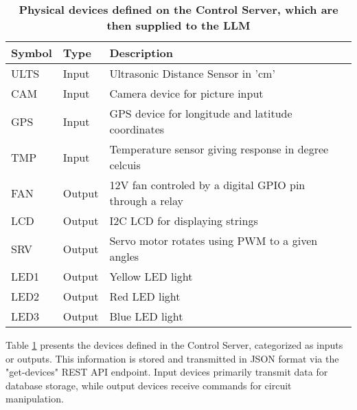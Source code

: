 \documentclass{ieeeaccess}
\begin{document}
\begin{table}
    \caption{\textbf{Physical devices defined on the Control Server, which are then supplied to the LLM}}
    \label{table1}
    \setlength{\tabcolsep}{3pt}
    \begin{tabular}{|p{30pt}|p{25pt}|p{180pt}|}
        \hline
        \textbf{Symbol} &
        \textbf{Type}   &
        \textbf{Description}                                             \\
        \hline
        ULTS   &
        Input  &
        Ultrasonic Distance Sensor in 'cm'                      \\
        \hline
        CAM    &
        Input  &
        Camera device for picture input                         \\
        \hline
        GPS    &
        Input  &
        GPS device for longitude and latitude coordinates       \\
        \hline
        TMP    &
        Input  &
        Temperature sensor giving response in degree celcuis    \\
        \hline
        FAN    &
        Output &
        12V fan controled by a digital GPIO pin through a relay \\
        \hline
        LCD    &
        Output &
        I2C LCD for displaying strings                          \\
        \hline
        SRV    &
        Output &
        Servo motor rotates using PWM to a given angles         \\
        \hline
        LED1   &
        Output &
        Yellow LED light                                        \\
        \hline
        LED2   &
        Output &
        Red LED light                                           \\
        \hline
        LED3   &
        Output &
        Blue LED light                                          \\
        \hline
    \end{tabular}
\end{table}

Table \ref{table1} presents the devices defined in the Control Server, categorized as inputs or outputs. This information is stored and transmitted in JSON format via the "get-devices" REST API endpoint. Input devices primarily transmit data for database storage, while output devices receive commands for circuit manipulation.
\end{document}
